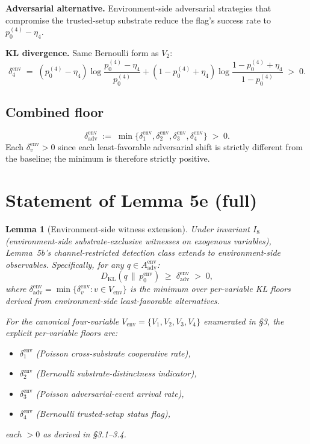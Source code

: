 \documentclass{article}
\newtheorem{lemma}{Lemma}
\newcommand{\Aadv}{A_{\mathrm{adv}}}
\newcommand{\deltaadv}{\delta_{\mathrm{adv}}}
\begin{document}
\textbf{Adversarial alternative.}  Environment-side adversarial
strategies that compromise the trusted-setup substrate reduce the
flag's success rate to $p_0^{(4)} - \eta_4$.

\textbf{KL divergence.}  Same Bernoulli form as $V_2$:
\[
  \delta_4^{\mathrm{env}} \;=\; (p_0^{(4)} - \eta_4)
  \log\!\frac{p_0^{(4)} - \eta_4}{p_0^{(4)}} +
  (1 - p_0^{(4)} + \eta_4) \log\!\frac{1 - p_0^{(4)} + \eta_4}
  {1 - p_0^{(4)}} \;>\; 0.
\]

\subsection{Combined floor}

\[
  \deltaadv^{\mathrm{env}} \;:=\; \min\{\delta_1^{\mathrm{env}},
  \delta_2^{\mathrm{env}}, \delta_3^{\mathrm{env}},
  \delta_4^{\mathrm{env}}\} \;>\; 0.
\]
Each $\delta_v^{\mathrm{env}} > 0$ since each least-favorable
adversarial shift is strictly different from the baseline; the
minimum is therefore strictly positive.

\section{Statement of Lemma 5e (full)}

\begin{lemma}[Environment-side witness extension]
\label{lem:5e}
Under invariant $I_8$ (environment-side substrate-exclusive
witnesses on exogenous variables), Lemma~5b's channel-restricted
detection class extends to environment-side observables.
Specifically, for any $q \in \Aadv^{\mathrm{env}}$:
\[
  D_{\mathrm{KL}}(q \,\|\, p_0^{\mathrm{env}}) \;\geq\;
  \deltaadv^{\mathrm{env}} \;>\; 0,
\]
where $\deltaadv^{\mathrm{env}} = \min\{\delta_v^{\mathrm{env}} :
v \in V_{\mathrm{env}}\}$ is the minimum over per-variable KL
floors derived from environment-side least-favorable alternatives.

For the canonical four-variable $V_{\mathrm{env}} = \{V_1, V_2,
V_3, V_4\}$ enumerated in §3, the explicit per-variable floors are:
\begin{itemize}
\item $\delta_1^{\mathrm{env}}$ (Poisson cross-substrate cooperative
  rate),
\item $\delta_2^{\mathrm{env}}$ (Bernoulli substrate-distinctness
  indicator),
\item $\delta_3^{\mathrm{env}}$ (Poisson adversarial-event arrival
  rate),
\item $\delta_4^{\mathrm{env}}$ (Bernoulli trusted-setup status
  flag),
\end{itemize}
each $> 0$ as derived in §3.1--3.4.
\end{lemma}
\end{document}
